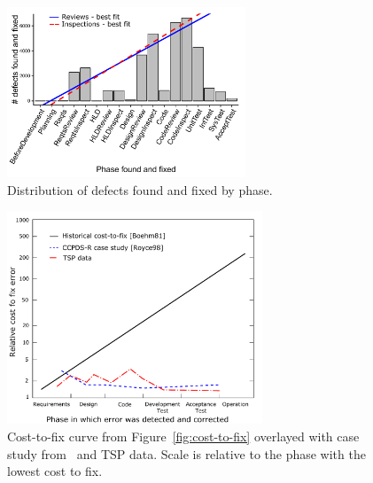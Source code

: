 \documentclass{sig-alternate}
\newcommand{\todo}[1]{\textcolor{Maroon}{TODO: #1}}
\newcommand{\bi}{\begin{itemize}}%
\newcommand{\ei}{\end{itemize}}
\newcommand{\fig}[1]{Figure~\ref{fig:#1}}
\begin{document}

 
 

\begin{figure}[!t] 

\begin{center}
\includegraphics[height=2in]{img/fix-phase-dist.pdf}
\end{center}

\caption{Distribution of defects found and fixed by phase.}
\label{fig:fix-phase-dist}
\end{figure}



\begin{figure}[!t] 
\begin{center}
\includegraphics[width=3in]{img/boehm-overlay.pdf}
 \end{center}
 
 \caption{Cost-to-fix curve from \protect\fig{cost-to-fix} 
 overlayed with case study from~\cite{Royce98} and TSP data. Scale is relative to the phase with the lowest cost to fix. }\label{fig:cost-to-fix-tsp}
 \end{figure}
\end{document}
